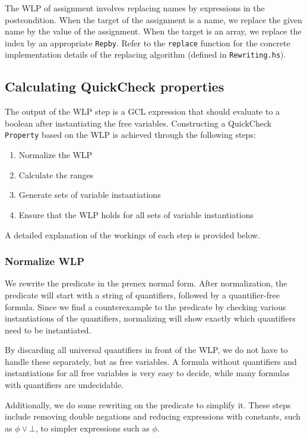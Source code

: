 \documentclass[a4paper]{article}
\begin{document}
The WLP of assignment involves replacing names by expressions in the postcondition.
When the target of the assignment is a name, we replace the given name by the value
of the assignment. When the target is an array, we replace the index by an appropriate
\texttt{Repby}. Refer to the \texttt{replace} function for the concrete implementation
details of the replacing algorithm (defined in \texttt{Rewriting.hs}).

\subsection{Calculating QuickCheck properties}

The output of the WLP step is a GCL expression that should evaluate to a boolean
after instantiating the free variables. Constructing a QuickCheck \texttt{Property}
based on the WLP is achieved through the following steps:

\begin{enumerate}
\item Normalize the WLP
\item Calculate the ranges
\item Generate sets of variable instantiations
\item Ensure that the WLP holds for all sets of variable instantiations
\end{enumerate}

A detailed explanation of the workings of each step is provided below.

\subsubsection*{Normalize WLP}

We rewrite the predicate in the prenex normal form. After normalization, the
predicate will start with a string of quantifiers, followed by a quantifier-free
formula. Since we find a counterexample to the predicate by checking various
instantiations of the quantifiers, normalizing will show exactly which
quantifiers need to be instantiated.

By discarding all universal quantifiers in front of the WLP, we do not have to
handle these separately, but as free variables. A formula without quantifiers
and instantiations for all free variables is very easy to decide, while many
formulas with quantifiers are undecidable.

Additionally, we do some rewriting on the predicate to simplify it. These steps
include removing double negations and reducing expressions with constants,
such as $\phi \vee \bot$, to simpler expressions such as $\phi$.
\end{document}
